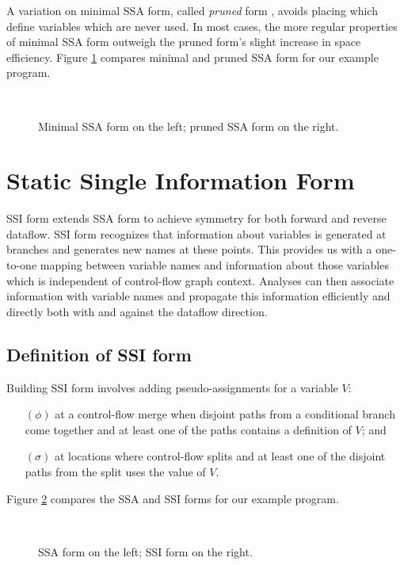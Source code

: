 \documentclass[12pt,notitlepage,twoside]{article}
\begin{document}
A variation
on minimal SSA form, called \emph{pruned} form \cite{ferrante91:pruned},
avoids placing  which define variables which are never used.
In most cases, the more regular properties of minimal SSA form
outweigh the pruned form's slight increase in space efficiency.
Figure \ref{fig:prunedssa} compares minimal and pruned SSA form for
our example program.
\begin{figure}\label{fig:prunedssa}
\begin{center}
 \vline\ 
\end{center}
\caption{Minimal SSA form on the left; pruned SSA form on the right.}
\end{figure}

\section{Static Single Information Form}

SSI form extends SSA form to achieve symmetry for both forward and
reverse dataflow.   SSI form recognizes that information about
variables is generated at branches and generates new names at these
points.  This provides us with a one-to-one mapping between variable
names and information about those variables which is independent of
control-flow graph context.  Analyses can then associate information
with variable names and propagate this information efficiently and
directly both with and against the dataflow direction.

\subsection{Definition of SSI form}
Building SSI form involves adding pseudo-assignments for a variable $V$:
\begin{enumerate}
\item[$(\phi)$] at a control-flow merge when disjoint paths from a
conditional branch come together and at least one of the paths
contains a definition of $V$; and
\item[$(\sigma)$] at locations where control-flow splits and at least
one of the disjoint paths from the split uses the value of $V$.
\end{enumerate}

Figure \ref{fig:tossi} compares the SSA and SSI forms for our example program.
\begin{figure}\label{fig:tossi}
\begin{center}
 \vline\ 
\end{center}
\caption{SSA form on the left; SSI form on the right.}
\end{figure}
\end{document}
